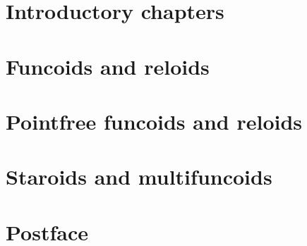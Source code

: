 \documentclass[letterpaper,oneside,english,reqno]{amsbook}
\numberwithin{section}{chapter}
\begin{document}

\maketitle

\tableofcontents{}

\part{Introductory chapters}







\part{Funcoids and reloids}














\part{Pointfree funcoids and reloids}



\part{Staroids and multifuncoids}


\part{Postface}





\printindex{}




\addtocounter{figure}{-1}
\label{LASTFIGURE}
\end{document}
